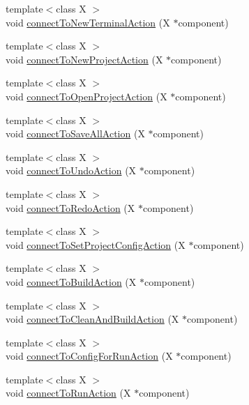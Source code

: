 \begin{DoxyCompactItemize}
\item 
{\footnotesize template$<$class X $>$ }\\void \hyperlink{class_master_actions_aeca9ddb448704bcc3a7e9ac3a66d5b57}{connect\-To\-New\-Terminal\-Action} (X $\ast$component)
\item 
{\footnotesize template$<$class X $>$ }\\void \hyperlink{class_master_actions_a7eb69b0a616b949086f7422394f6c881}{connect\-To\-New\-Project\-Action} (X $\ast$component)
\item 
{\footnotesize template$<$class X $>$ }\\void \hyperlink{class_master_actions_aa792c3936e0b0b4c016d01ad4a1c5803}{connect\-To\-Open\-Project\-Action} (X $\ast$component)
\item 
{\footnotesize template$<$class X $>$ }\\void \hyperlink{class_master_actions_ab859d0b5419ae5f17504e8fdd83be4be}{connect\-To\-Save\-All\-Action} (X $\ast$component)
\item 
{\footnotesize template$<$class X $>$ }\\void \hyperlink{class_master_actions_a6590f8772608e4d99efbf16ef9625b78}{connect\-To\-Undo\-Action} (X $\ast$component)
\item 
{\footnotesize template$<$class X $>$ }\\void \hyperlink{class_master_actions_a6077c09ff4426c4a99eaa33ff12f22e4}{connect\-To\-Redo\-Action} (X $\ast$component)
\item 
{\footnotesize template$<$class X $>$ }\\void \hyperlink{class_master_actions_a5e25d464651d37d48c7e6a4714130dd7}{connect\-To\-Set\-Project\-Config\-Action} (X $\ast$component)
\item 
{\footnotesize template$<$class X $>$ }\\void \hyperlink{class_master_actions_a9625507b1a412bd95bdc13ae54bc68a2}{connect\-To\-Build\-Action} (X $\ast$component)
\item 
{\footnotesize template$<$class X $>$ }\\void \hyperlink{class_master_actions_a86232c67d3599a28c6b5238eb6dd4e88}{connect\-To\-Clean\-And\-Build\-Action} (X $\ast$component)
\item 
{\footnotesize template$<$class X $>$ }\\void \hyperlink{class_master_actions_a87ff14d6fdf08f3730bb733747335dcb}{connect\-To\-Config\-For\-Run\-Action} (X $\ast$component)
\item 
{\footnotesize template$<$class X $>$ }\\void \hyperlink{class_master_actions_a73ec685aa0f239226bdda78857b9e234}{connect\-To\-Run\-Action} (X $\ast$component)

\end{DoxyCompactItemize}
